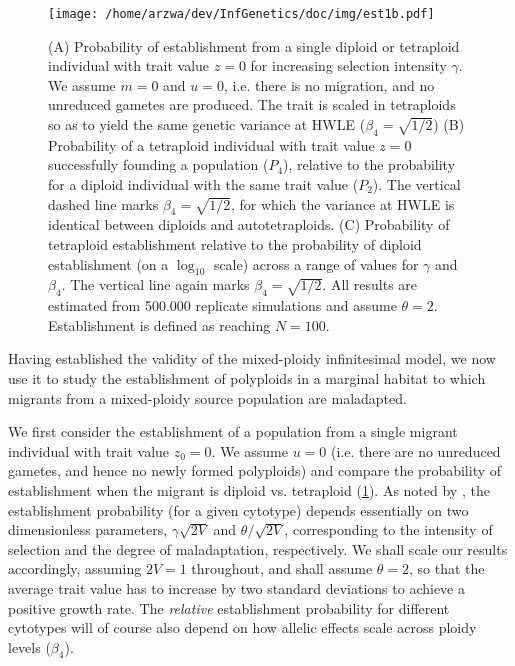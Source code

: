 \documentclass[12pt,a4paper]{article}
\begin{document}
\begin{figure}[t]
\centering
\texttt{[image: /home/arzwa/dev/InfGenetics/doc/img/est1b.pdf]}
\caption{
(A) Probability of establishment from a single diploid or tetraploid individual
with trait value $z=0$ for increasing selection intensity $\gamma$.
We assume $m=0$ and $u=0$, i.e. there is no migration, and no unreduced
gametes are produced. The trait is scaled in tetraploids so as to yield the
same genetic variance at HWLE ($\beta_4 = \sqrt{1/2}$)
(B) Probability of a tetraploid individual with trait value $z = 0$
successfully founding a population ($P_4$), relative to the probability for a
diploid individual with the same trait value ($P_2$).
The vertical dashed line marks $\beta_4=\sqrt{1/2}$, for which the variance at
HWLE is identical between diploids and autotetraploids.
(C) Probability of tetraploid establishment relative to the probability of
diploid establishment (on a $\log_{10}$ scale) across a range of values for
$\gamma$ and $\beta_4$. The vertical line again marks $\beta_4=\sqrt{1/2}$.
All results are estimated from 500.000 replicate simulations and assume
$\theta=2$. Establishment is defined as reaching $N=100$.
\label{fig:est1}}
\end{figure}


Having established the validity of the mixed-ploidy infinitesimal model, we now
use it to study the establishment of polyploids in a marginal habitat to which
migrants from a mixed-ploidy source population are maladapted.

We first consider the establishment of a population from a single migrant
individual with trait value $z_0 = 0$.
We assume $u=0$ (i.e. there are no unreduced gametes, and hence no newly formed
polyploids) and compare the probability of establishment when the migrant
is diploid vs. tetraploid (\cref{fig:est1}).
As noted by \cite{barton2018}, the establishment probability (for a given
cytotype) depends essentially on two dimensionless parameters,
$\gamma\sqrt{2V}$ and $\theta/\sqrt{2V}$, corresponding to the intensity of
selection and the degree of maladaptation, respectively.
We shall scale our results accordingly, assuming $2V=1$ throughout, and shall
assume $\theta=2$, so that the average trait value has to increase by two
standard deviations to achieve a positive growth rate.
The \textit{relative} establishment probability for different cytotypes will of
course also depend on how allelic effects scale across ploidy levels ($\beta_4$).
\end{document}
